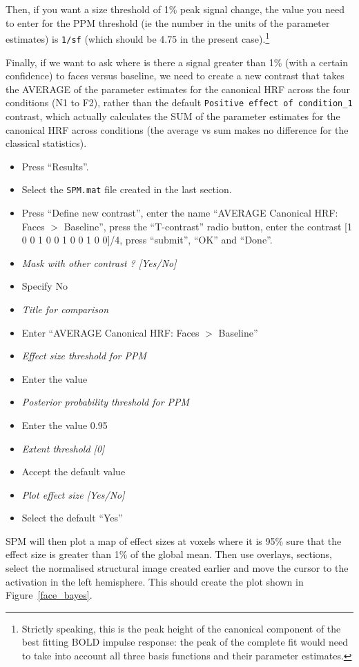 Then, if you want a size threshold of 1\% peak signal change, the value you need to enter for the PPM threshold (ie the number in the units of the parameter estimates) is \texttt{1/sf} (which should be 4.75 in the present case).\footnote{Strictly speaking, this is the peak height of the canonical component of the best fitting BOLD impulse response: the peak of the complete fit would need to take into account all three basis functions and their parameter estimates.}

Finally, if we want to ask where is there a signal greater than 1\% (with a certain confidence) to faces versus baseline, we need to create a new contrast that takes the AVERAGE of the parameter estimates for the canonical HRF across the four conditions (N1 to F2), rather than the default \texttt{Positive effect of condition\_1} contrast, which actually calculates the SUM of the parameter estimates for the canonical HRF across conditions (the average vs sum makes no difference for the classical statistics).

\begin{itemize}
\item Press ``Results''.
\item Select the \texttt{SPM.mat} file created in the last section.
\item Press ``Define new contrast'', enter the name ``AVERAGE Canonical HRF: Faces $>$ Baseline'', press the ``T-contrast'' radio button, enter the contrast [1 0 0 1 0 0 1 0 0 1 0 0]/4, press ``submit'', ``OK'' and ``Done''.
\item \emph{Mask with other contrast ? [Yes/No]}
\item Specify No
\item \emph{Title for comparison}
\item Enter ``AVERAGE Canonical HRF: Faces $>$ Baseline''
\item \emph{Effect size threshold for PPM}
\item Enter the value
\item \emph{Posterior probability threshold for PPM}
\item Enter the value 0.95
\item \emph{Extent threshold [0]}
\item Accept the default value
\item \emph{Plot effect size [Yes/No]}
\item Select the default ``Yes''
\end{itemize}
SPM will then plot a map of effect sizes at voxels where it is 95\% sure that the effect size is greater than 1\% of the global mean.
Then use overlays, sections, select the normalised structural image created earlier and move the cursor to the activation in the left hemisphere. This should create the plot shown in Figure~\ref{face_bayes}.

